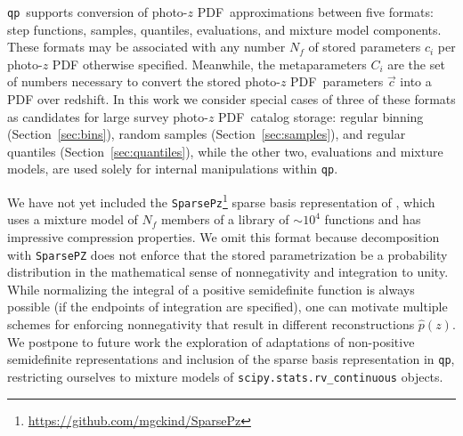 \documentclass[\docopts]{\docclass}
\newcommand{\qp}{\texttt{qp}}
\newcommand{\pz}{photo-$z$ PDF}
\begin{document}
\qp\ supports conversion of \pz\ approximations between five formats: step 
functions, samples, quantiles, evaluations, and mixture model components.
These formats may be associated with any number $N_{f}$ of stored parameters 
$c_{i}$ per \pz%
otherwise specified.
Meanwhile, the metaparameters $C_{i}$ are the set of numbers necessary to 
convert the stored \pz\ parameters $\vec{c}$ into a PDF over redshift.
In this work we consider special cases of three of these formats as candidates 
for large survey \pz\ catalog storage: regular binning 
(Section~\ref{sec:bins}), random samples (Section~\ref{sec:samples}), and 
regular quantiles (Section~\ref{sec:quantiles}), while the other two, 
evaluations and mixture models, are used solely for internal manipulations 
within \qp.

We have not yet included the 
\texttt{SparsePz}\footnote{\url{https://github.com/mgckind/SparsePz}} sparse 
basis representation of \citet{carrasco_kind_sparse_2014}, which uses a mixture 
model of $N_{f}$ members of a library of $\sim10^{4}$ functions and has 
impressive compression properties.
We omit this format because decomposition with \texttt{SparsePZ} does not 
enforce that the stored parametrization be a probability distribution in the 
mathematical sense of nonnegativity and integration to unity.
While normalizing the integral of a positive semidefinite function is always 
possible (if the endpoints of integration are specified), one can motivate 
multiple schemes for enforcing nonnegativity that result in different 
reconstructions $\hat{p}(z)$.
We postpone to future work the exploration of adaptations of non-positive 
semidefinite representations and inclusion of the sparse basis representation 
in \qp, restricting ourselves to mixture models of 
\texttt{scipy.stats.rv\_continuous} objects.
\end{document}
